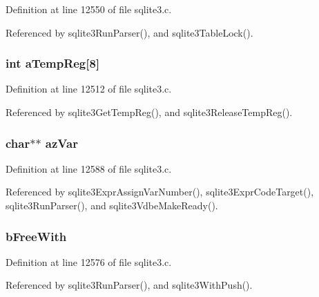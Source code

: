 Definition at line 12550 of file sqlite3.\+c.



Referenced by sqlite3\+Run\+Parser(), and sqlite3\+Table\+Lock().

\hypertarget{struct_parse_a6876558d9922578aecf96e36ce54e8f3}{}
\subsubsection[{a\+Temp\+Reg}]{\setlength{\rightskip}{0pt plus 5cm}int a\+Temp\+Reg\mbox{[}8\mbox{]}}\label{struct_parse_a6876558d9922578aecf96e36ce54e8f3}


Definition at line 12512 of file sqlite3.\+c.



Referenced by sqlite3\+Get\+Temp\+Reg(), and sqlite3\+Release\+Temp\+Reg().

\hypertarget{struct_parse_a61698685ffc73e64afd9ed436a5a101a}{}
\subsubsection[{az\+Var}]{\setlength{\rightskip}{0pt plus 5cm}char$\ast$$\ast$ az\+Var}\label{struct_parse_a61698685ffc73e64afd9ed436a5a101a}


Definition at line 12588 of file sqlite3.\+c.



Referenced by sqlite3\+Expr\+Assign\+Var\+Number(), sqlite3\+Expr\+Code\+Target(), sqlite3\+Run\+Parser(), and sqlite3\+Vdbe\+Make\+Ready().

\hypertarget{struct_parse_a8f3eca69a1045d4da99782215c858394}{}
\subsubsection[{b\+Free\+With}]{ b\+Free\+With}\label{struct_parse_a8f3eca69a1045d4da99782215c858394}


Definition at line 12576 of file sqlite3.\+c.



Referenced by sqlite3\+Run\+Parser(), and sqlite3\+With\+Push().

\hypertarget{struct_parse_ab88e9b991c31238e6c7af0564bb247dd}{}
